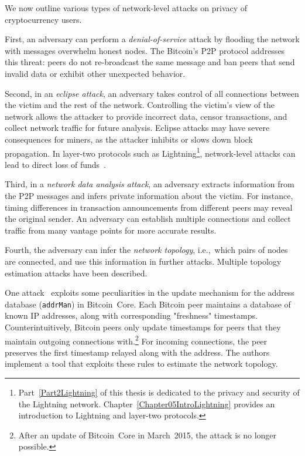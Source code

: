 We now outline various types of network-level attacks on privacy of cryptocurrency users.

First, an adversary can perform a \textit{denial-of-service} attack by flooding the network with messages overwhelm honest nodes.
The Bitcoin's P2P protocol addresses this threat: peers do not re-broadcast the same message and ban peers that send invalid data or exhibit other unexpected behavior.

Second, in an \textit{eclipse attack}, an adversary takes control of all connections between the victim and the rest of the network.
Controlling the victim's view of the network allows the attacker to provide incorrect data, censor transactions, and collect network traffic for future analysis.
Eclipse attacks may have severe consequences for miners, as the attacker inhibits or slows down block propagation.
In layer-two protocols such as Lightning\footnote{Part~\ref{Part2Lightning} of this thesis is dedicated to the privacy and security of the Lightning network. Chapter~\ref{Chapter05IntroLightning} provides an introduction to Lightning and layer-two protocols.}, network-level attacks can lead to direct loss of funds~\cite{Riard2020}.

Third, in a \textit{network data analysis attack}, an adversary extracts information from the P2P messages and infers private information about the victim.
For instance, timing differences in transaction announcements from different peers may reveal the original sender.
An adversary can establish multiple connections and collect traffic from many vantage points for more accurate results.

Fourth, the adversary can infer the \textit{network topology}, i.e.,~which pairs of nodes are connected, and use this information in further attacks.
Multiple topology estimation attacks have been described.

One attack~\cite{Miller2015} exploits some peculiarities in the update mechanism for the address database (\texttt{addrMan}) in Bitcoin~Core.
Each Bitcoin peer maintains a database of known IP addresses, along with corresponding "freshness" timestamps.
Counterintuitively, Bitcoin peers only update timestamps for peers that they maintain outgoing connections with.\footnote{After an update of Bitcoin~Core in March~2015, the attack is no longer possible.}
For incoming connections, the peer preserves the first timestamp relayed along with the address.
The authors implement a tool that exploits these rules to estimate the network topology.

